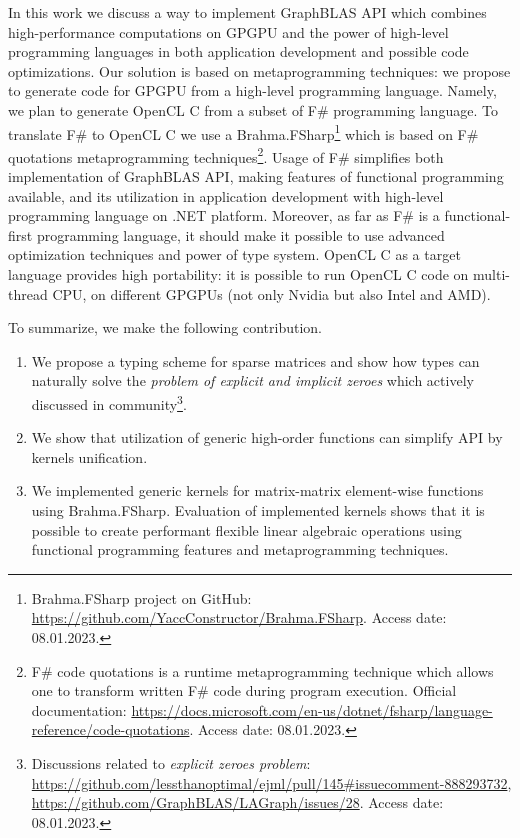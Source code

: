 In this work we discuss a way to implement GraphBLAS API which combines high-performance computations on GPGPU and the power of high-level programming languages in both application development and possible code optimizations.
Our solution is based on metaprogramming techniques: we propose to generate code for GPGPU from a high-level programming language.
Namely, we plan to generate OpenCL C from a subset of  F\# programming language.
To translate F\# to OpenCL C we use a Brahma.FSharp\footnote{Brahma.FSharp project on GitHub: \url{https://github.com/YaccConstructor/Brahma.FSharp}. Access date: 08.01.2023.} which is based on F\# quotations metaprogramming techniques\footnote{F\# code quotations is a runtime metaprogramming technique which allows one to transform written F\# code during program execution. Official documentation: \url{https://docs.microsoft.com/en-us/dotnet/fsharp/language-reference/code-quotations}. Access date: 08.01.2023.}.
Usage of F\# simplifies both implementation of GraphBLAS API, making features of functional programming available, and its utilization in application development with high-level programming language on .NET platform.
Moreover, as far as F\# is a functional-first programming language, it should make it possible to use advanced optimization techniques and power of type system.
OpenCL C as a target language provides high portability: it is possible to run OpenCL C code on multi-thread CPU, on different GPGPUs (not only Nvidia but also Intel and AMD).

To summarize, we make the following contribution.
\begin{enumerate}
   \item We propose a typing scheme for sparse matrices and show how types can naturally solve the \textit{problem of explicit and implicit zeroes} which actively discussed in community\footnote{Discussions related to \textit{explicit zeroes problem}: \url{https://github.com/lessthanoptimal/ejml/pull/145\#issuecomment-888293732}, \url{https://github.com/GraphBLAS/LAGraph/issues/28}. Access date: 08.01.2023.}.
   \item We show that utilization of generic high-order functions can simplify API by kernels unification.
   \item We implemented generic kernels for matrix-matrix element-wise functions using Brahma.FSharp.
   Evaluation of implemented kernels shows that it is possible to create performant flexible linear algebraic operations using functional programming features and metaprogramming techniques.
\end{enumerate}